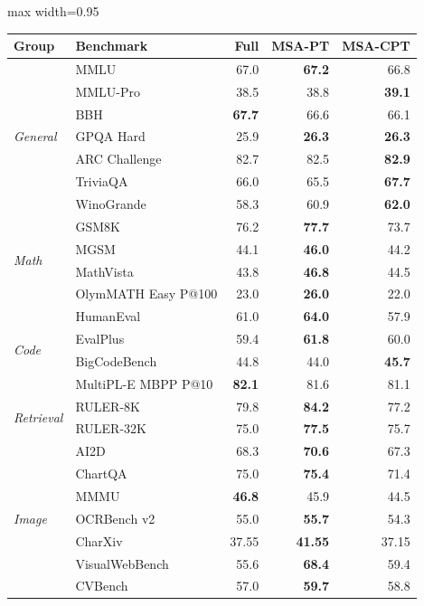 \documentclass{llmxive}
\providecommand{\method}{\textsc{MSA}}
\providecommand{\arraystretch}{0.92}
\begin{document}
\begin{table}[!htbp]
\centering
{\small
\renewcommand{\arraystretch}{0.92}
\begin{adjustbox}{max width=0.95\linewidth}
\begin{tabular}{llrrr}
\toprule
Group & Benchmark & Full & \method{}-PT & \method{}-CPT \\
\midrule
\multirow{7}{*}{\textit{General}} & MMLU & 67.0 & \textbf{67.2} & 66.8 \\
 & MMLU-Pro & 38.5 & 38.8 & \textbf{39.1} \\
 & BBH & \textbf{67.7} & 66.6 & 66.1 \\
 & GPQA Hard & 25.9 & \textbf{26.3} & \textbf{26.3} \\
 & ARC Challenge & 82.7 & 82.5 & \textbf{82.9} \\
 & TriviaQA & 66.0 & 65.5 & \textbf{67.7} \\
 & WinoGrande & 58.3 & 60.9 & \textbf{62.0} \\
\midrule
\multirow{4}{*}{\textit{Math}} & GSM8K & 76.2 & \textbf{77.7} & 73.7 \\
 & MGSM & 44.1 & \textbf{46.0} & 44.2 \\
 & MathVista & 43.8 & \textbf{46.8} & 44.5 \\
 & OlymMATH Easy P@100 & 23.0 & \textbf{26.0} & 22.0 \\
\midrule
\multirow{4}{*}{\textit{Code}} & HumanEval & 61.0 & \textbf{64.0} & 57.9 \\
 & EvalPlus & 59.4 & \textbf{61.8} & 60.0 \\
 & BigCodeBench & 44.8 & 44.0 & \textbf{45.7} \\
 & MultiPL-E MBPP P@10 & \textbf{82.1} & 81.6 & 81.1 \\
\midrule
\multirow{2}{*}{\textit{Retrieval}} & RULER-8K & 79.8 & \textbf{84.2} & 77.2 \\
 & RULER-32K & 75.0 & \textbf{77.5} & 75.7 \\
\midrule
\multirow{7}{*}{\textit{Image}} & AI2D & 68.3 & \textbf{70.6} & 67.3 \\
 & ChartQA & 75.0 & \textbf{75.4} & 71.4 \\
 & MMMU & \textbf{46.8} & 45.9 & 44.5 \\
 & OCRBench v2 & 55.0 & \textbf{55.7} & 54.3 \\
 & CharXiv & 37.55 & \textbf{41.55} & 37.15 \\
 & VisualWebBench & 55.6 & \textbf{68.4} & 59.4 \\
 & CVBench & 57.0 & \textbf{59.7} & 58.8 \\

\end{tabular}
\end{adjustbox}}
\end{table}
\end{document}
